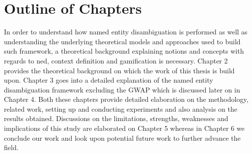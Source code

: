 \section{Outline of Chapters}
In order to understand how named entity disambiguation is performed as well as understanding the underlying theoretical models and approaches used to build such framework, a theoretical background explaining notions and concepts with regards to \ac{ned}, context definition and gamification is necessary. Chapter 2 provides the theoretical background on which the work of this thesis is build upon. Chapter 3 goes into a detailed explanation of the named entity disambiguation framework excluding the GWAP which is discussed later on in Chapter 4. Both these chapters provide detailed elaboration on the methodology, related work, setting up and conducting experiments and also analysis on the results obtained. Discussions on the limitations, strengths, weaknesses and implications of this study are elaborated on Chapter 5 whereas in Chapter 6 we conclude our work and look upon potential future work to further advance the field.
